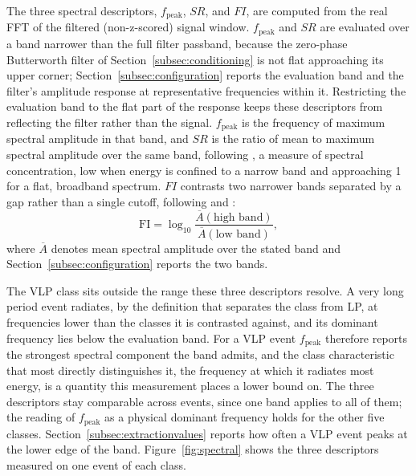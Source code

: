 \documentclass[pdflatex,sn-mathphys-num]{sn-jnl}
\begin{document}
The three spectral descriptors, $f_{\text{peak}}$, $SR$, and $FI$, are
computed from the real FFT of the filtered (non-z-scored) signal window.
$f_{\text{peak}}$ and $SR$ are evaluated over a band narrower than the full
filter passband, because the zero-phase Butterworth filter of
Section~\ref{subsec:conditioning} is not flat approaching its upper corner;
Section~\ref{subsec:configuration} reports the evaluation band and the filter's
amplitude response at representative frequencies within it. Restricting the
evaluation band to the flat part of
the response keeps these descriptors from reflecting the filter rather than
the signal. $f_{\text{peak}}$ is the frequency of maximum spectral amplitude
in that band, and $SR$ is the ratio of mean to maximum spectral amplitude over
the same band, following \cite{cui_subdivision_2021}, a measure of spectral
concentration, low when energy is confined to a narrow band and approaching
1 for a flat, broadband spectrum. $FI$ contrasts two narrower bands separated
by a gap rather than a single cutoff, following \cite{cui_subdivision_2021} and
\cite{buurman_seismic_2010}:
\begin{equation}
\mathrm{FI} = \log_{10}\frac{\overline{A}(\text{high band})}{\overline{A}(\text{low band})},
\end{equation}
where $\overline{A}$ denotes mean spectral amplitude over the stated band and
Section~\ref{subsec:configuration} reports the two bands.

The VLP class sits outside the range these three descriptors resolve. A very
long period event radiates, by the definition that separates the class from
LP, at frequencies lower than the classes it is contrasted against, and its
dominant frequency lies below the evaluation band. For a VLP event
$f_{\text{peak}}$ therefore reports the strongest spectral component the band
admits, and the class characteristic that most directly distinguishes it, the
frequency at which it radiates most energy, is a quantity this measurement
places a lower bound on. The three descriptors stay comparable across events,
since one band applies to all of them; the reading of
$f_{\text{peak}}$ as a physical dominant frequency holds for the other five
classes. Section~\ref{subsec:extractionvalues} reports how often a VLP event peaks at
the lower edge of the band.
Figure~\ref{fig:spectral} shows the three descriptors measured on one event
of each class.
\end{document}
